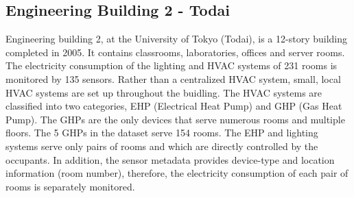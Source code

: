 \subsection{Engineering Building 2 - Todai}\label{data:engbldg2}
Engineering building 2, at the University of Tokyo (Todai), is a 12-story building completed in 2005.  It contains
classrooms, laboratories, offices and server rooms.  
The electricity consumption of the lighting and HVAC systems of 231 rooms is monitored by 135 sensors.
Rather than a centralized HVAC system, small, local HVAC systems are set up throughout the buidling.  
The HVAC systems are classified into two categories, EHP (Electrical Heat Pump) and GHP (Gas Heat Pump).
The GHPs are the only devices that serve numerous rooms and multiple floors.  The 5 GHPs in the dataset serve 154 rooms.
The EHP and lighting systems serve only pairs of rooms and which are directly controlled by the occupants.
In addition, the sensor metadata provides device-type and location information (room number), 
therefore, the electricity consumption of each pair of rooms is separately monitored.

